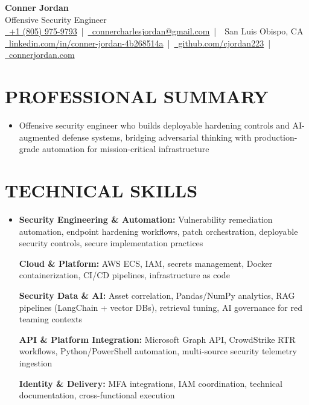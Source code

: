 \documentclass[letterpaper,10pt]{article}
\newcommand{\resumeSubHeadingListStart}{\begin{itemize}[leftmargin=0in,label={}]}
\newcommand{\resumeSubHeadingListEnd}{\end{itemize}}
\begin{document}
\begin{center}
  {\Huge \textbf{Conner Jordan}}\\[0pt]
  {\Large Offensive Security Engineer}\\[0pt]
  \href{tel:+18059759793}{\faPhone\ +1 (805) 975-9793} \,|\, 
  \href{mailto:connercharlesjordan@gmail.com}{\faEnvelope\ connercharlesjordan@gmail.com} \,|\, 
  \faMapMarker\ San Luis Obispo, CA \\[-2pt]
  \href{https://www.linkedin.com/in/conner-jordan-4b268514a/}{\faLinkedin\ linkedin.com/in/conner-jordan-4b268514a}
  \,|\, \href{https://github.com/cjordan223}{\faGithub\ github.com/cjordan223}
  \,|\, \href{https://connerjordan.com/}{\faGlobe\ connerjordan.com}
\end{center}

\vspace{4pt}

\section{PROFESSIONAL SUMMARY}
\vspace{8pt}
\resumeSubHeadingListStart
\item {\small
Offensive security engineer who builds deployable hardening controls and AI-augmented defense systems, bridging adversarial thinking with production-grade automation for mission-critical infrastructure}
\resumeSubHeadingListEnd
\vspace{6pt}

\section{TECHNICAL SKILLS}
\vspace{6pt}
\resumeSubHeadingListStart
\item {\small
\textbf{Security Engineering \& Automation:} Vulnerability remediation automation, endpoint hardening workflows, patch orchestration, deployable security controls, secure implementation practices

\vspace{3pt}
\textbf{Cloud \& Platform:} AWS ECS, IAM, secrets management, Docker containerization, CI/CD pipelines, infrastructure as code

\vspace{3pt}
\textbf{Security Data \& AI:} Asset correlation, Pandas/NumPy analytics, RAG pipelines (LangChain + vector DBs), retrieval tuning, AI governance for red teaming contexts

\vspace{3pt}
\textbf{API \& Platform Integration:} Microsoft Graph API, CrowdStrike RTR workflows, Python/PowerShell automation, multi-source security telemetry ingestion

\vspace{3pt}
\textbf{Identity \& Delivery:} MFA integrations, IAM coordination, technical documentation, cross-functional execution
}
\resumeSubHeadingListEnd
\vspace{6pt}
\end{document}
